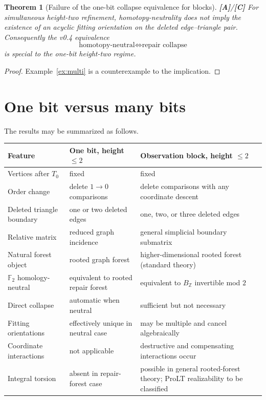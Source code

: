 \documentclass[11pt]{article}
\newtheorem{theorem}{Theorem}[section]
\theoremstyle{definition}
\newcommand{\F}{\mathbb F_2}
\newcommand{\statusA}{\textbf{[A]}}
\newcommand{\statusC}{\textbf{[C]}}
\begin{document}
\begin{theorem}[Failure of the one-bit collapse equivalence for blocks]\label{thm:failure}
\statusA/\statusC\;
For simultaneous height-two refinement, homotopy-neutrality does not imply the existence of an acyclic fitting orientation on the deleted edge--triangle pair. Consequently the v0.4 equivalence
\[
\text{homotopy-neutral}\iff\text{repair collapse}
\]
is special to the one-bit height-two regime.
\end{theorem}

\begin{proof}
Example~\ref{ex:multi} is a counterexample to the implication.
\end{proof}

\section{One bit versus many bits}

The results may be summarized as follows.

\begin{longtable}{>{\raggedright\arraybackslash}p{}>{\raggedright\arraybackslash}p{}>{\raggedright\arraybackslash}p{}}
\toprule
Feature & One bit, height $\le2$ & Observation block, height $\le2$\\
\midrule
Vertices after $T_0$ & fixed & fixed\\
Order change & delete $1\to0$ comparisons & delete comparisons with any coordinate descent\\
Deleted triangle boundary & one or two deleted edges & one, two, or three deleted edges\\
Relative matrix & reduced graph incidence & general simplicial boundary submatrix\\
Natural forest object & rooted graph forest & higher-dimensional rooted forest (standard theory)\\
$\F$ homology-neutral & equivalent to rooted repair forest & equivalent to $B_{\mathbb Z}$ invertible mod $2$\\
Direct collapse & automatic when neutral & sufficient but not necessary\\
Fitting orientations & effectively unique in neutral case & may be multiple and cancel algebraically\\
Coordinate interactions & not applicable & destructive and compensating interactions occur\\
Integral torsion & absent in repair-forest case & possible in general rooted-forest theory; ProLT realizability to be classified\\
\bottomrule
\end{longtable}
\end{document}
